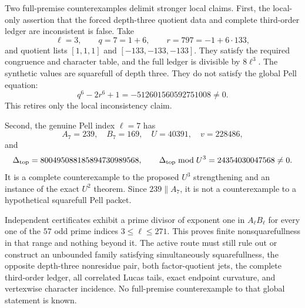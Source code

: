 Two full-premise counterexamples delimit stronger local claims.  First, the
local-only assertion that the forced depth-three quotient data and complete
third-order ledger are inconsistent is false.  Take
\[
 \ell=3,\qquad q=7=1+6,\qquad r=797=-1+6\cdot133,
\]
and quotient lists $[1,1,1]$ and $[-133,-133,-133]$.  They satisfy the
required congruence and character table, and the full ledger is divisible by
$8\ell^3$.  The synthetic values are squarefull of depth three.  They do
not satisfy the global Pell equation:
\[
 q^6-2r^6+1=-512601560592751008\ne0.
\]
This retires only the local inconsistency claim.

Second, the genuine Pell index $\ell=7$ has
\[
 A_7=239,\quad B_7=169,\quad U=40391,\quad v=228486,
\]
and
\[
 \Delta_{\rm top}=800495088185894730989568,\qquad
 \Delta_{\rm top}\bmod U^3=24354030047568\ne0.
\]
It is a complete counterexample to the proposed $U^3$ strengthening and an
instance of the exact $U^2$ theorem.  Since $239\parallel A_7$, it is not a
counterexample to a hypothetical squarefull Pell packet.

Independent certificates exhibit a prime divisor of exponent one in
$A_\ell B_\ell$ for every one of the $57$ odd prime indices
$3\le\ell\le271$.  This proves finite nonsquarefullness in that range and
nothing beyond it.  The active route must still rule out or construct an
unbounded family satisfying simultaneously squarefullness, the opposite
depth-three nonresidue pair, both factor-quotient jets, the complete
third-order ledger, all correlated Lucas tails, exact endpoint curvature,
and vertexwise character incidence.  No full-premise counterexample to that
global statement is known.
